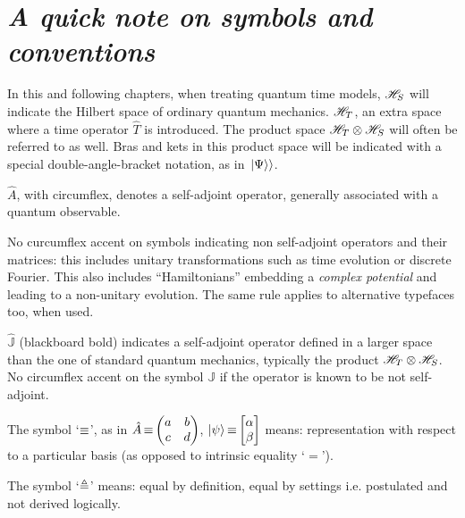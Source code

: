 \section*{\large\it A quick note on symbols and conventions}

\small

In this and following chapters, when treating quantum time models,
$\mathcal{H}_S$ will indicate the Hilbert space of ordinary quantum mechanics.
$\mathcal{H}_T$, an extra space where a time operator $\hat{T}$ is introduced. The product space $\mathcal{H}_T \otimes \mathcal{H}_S$
will often be referred to as well.
Bras and kets in this product space will be indicated with a special double-angle-bracket
notation, as in $\left.\left| \Psi \right\rangle\right\rangle$.

$\hat{A}$, with circumflex, denotes a self-adjoint operator, generally associated with a quantum observable.

No curcumflex accent on symbols indicating non self-adjoint operators and their matrices:
this includes unitary transformations such as
time evolution or discrete Fourier.
This also includes ``Hamiltonians'' embedding a \emph{complex potential}
and leading to a non-unitary evolution. The same rule applies to alternative typefaces too, when used.

$\hat{\mathbb{J}}$ (blackboard bold) indicates a self-adjoint operator defined in
a larger space than the one of standard quantum mechanics,
typically the product $\mathcal{H}_T \otimes \mathcal{H}_S$.
No circumflex accent on the symbol ${\mathbb{J}}$ if the operator is
known to be not self-adjoint.

The symbol `$\operatorname*{\equiv}$', as in $\hat{A} \repr \mqty(a&b\\c&d)$, $\ket{\psi} \repr \mqty[\alpha \\ \beta]$
means: representation with respect to a particular basis (as opposed to intrinsic equality `$=$').

The symbol `$\triangleq$'
means: equal by definition, equal by settings i.e. postulated and not derived logically.

\normalsize



